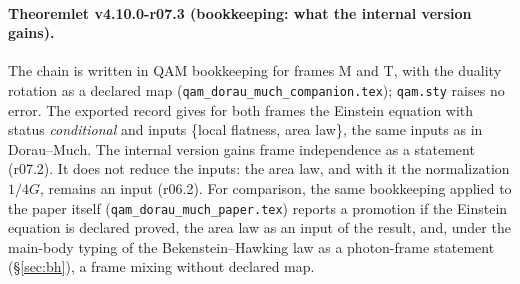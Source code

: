 \paragraph{Theoremlet v4.10.0-r07.3 (bookkeeping: what the internal version gains).}
The chain is written in QAM bookkeeping for frames M and T, with the duality rotation as a declared map
(\texttt{qam\_\allowbreak dorau\_\allowbreak much\_\allowbreak companion.tex}); \texttt{qam.sty} raises no error.  The exported record gives for both frames the
Einstein equation with status \emph{conditional} and inputs \{local flatness, area law\}, the same inputs as in Dorau--Much.  The internal version
gains frame independence as a statement (r07.2).  It does not reduce the inputs: the area law, and with it the normalization \(1/4G\), remains an
input (r06.2).  For comparison, the same bookkeeping applied to the paper itself (\texttt{qam\_\allowbreak dorau\_\allowbreak much\_\allowbreak paper.tex}) reports a
promotion if the Einstein equation is declared proved, the area law as an input of the result, and, under the main-body typing of the
Bekenstein--Hawking law as a photon-frame statement (\S\ref{sec:bh}), a frame mixing without declared map.

